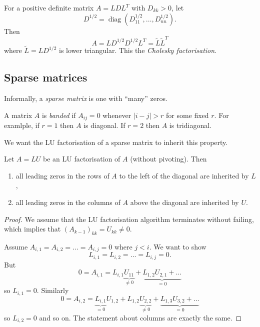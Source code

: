 \documentclass[a4paper]{article}
\begin{document}
For a positive definite matrix \(A = LDL^T\) with \(D_{kk} > 0\), let
\[
  D^{1/2} = \operatorname{diag}(D_{11}^{1/2}, \dots, D_{nn}^{1/2}).
\]
Then
\[
  A = LD^{1/2}D^{1/2}L^T = \tilde L \tilde L^T
\]
where \(\tilde L = LD^{1/2}\) is lower triangular. This the \emph{Cholesky factorisation}.

\subsection{Sparse matrices}

Informally, a \emph{sparse matrix} is one with ``many'' zeros.

\begin{eg}
  A matrix \(A\) is \emph{banded} if \(A_{ij} = 0\) whenever \(|i - j| > r\) for some fixed \(r\). For examlple, if \(r = 1\) then \(A\) is diagonal. If \(r = 2\) then \(A\) is tridiagonal.
\end{eg}

We want the LU factorisation of a sparse matrix to inherit this property.

\begin{theorem}
  Let \(A = LU\) be an LU factorisation of \(A\) (without pivoting). Then
  \begin{enumerate}
  \item all leading zeros in the rows of \(A\) to the left of the diagonal are inherited by \(L\),
  \item all leading zeros in the columns of \(A\) above the diagonal are inherited by \(U\).
  \end{enumerate}
\end{theorem}

\begin{proof}
  We assume that the LU factorisation algorithm terminates without failing, which implies that \((A_{k - 1})_{kk} = U_{kk} \neq 0\).

  Assume \(A_{i, 1} = A_{i, 2} = \dots = A_{i, j} = 0\) where \(j < i\). We want to show
  \[
    L_{i, 1} = L_{i, 2} = \dots = L_{i, j} = 0.
  \]
  But
  \[
    0 = A_{i, 1} = L_{i, 1}\underbrace{U_{11}}_{\neq 0} + \underbrace{L_{1, 2}U_{2, 1} + \dots}_{= 0}
  \]
  so \(L_{i, 1} = 0\). Similarly
  \[
    0 = A_{i, 2} = \underbrace{L_{i, 1}}_{= 0}U_{1, 2} + L_{1, 2}\underbrace{U_{2, 2}}_{\neq 0} + \underbrace{L_{1, 3}U_{3, 2} + \dots}_{= 0}
  \]
  so \(L_{i, 2} = 0\) and so on. The statement about columns are exactly the same.
\end{proof}
\end{document}
